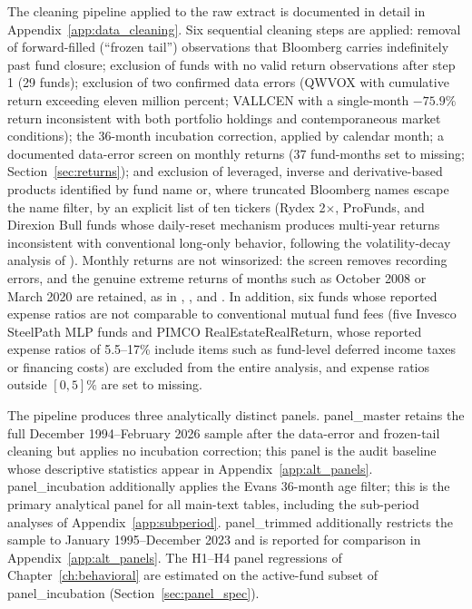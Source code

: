 \documentclass[12pt, oneside]{report}
\begin{document}
\noindent The cleaning pipeline applied to the raw extract is documented
in detail in Appendix~\ref{app:data_cleaning}. Six sequential cleaning
steps are applied: removal of forward-filled (``frozen tail'')
observations that Bloomberg carries indefinitely past fund closure; exclusion
of funds with no valid return observations after step 1 (29 funds);
exclusion of two confirmed data errors (QWVOX with cumulative return
exceeding eleven million percent; VALLCEN with a single-month
$-75.9\%$ return inconsistent with both portfolio holdings and
contemporaneous market conditions); the \textcite{Evans2010} 36-month
incubation correction, applied by calendar month; a documented data-error screen on monthly returns
(37 fund-months set to missing; Section~\ref{sec:returns}); and exclusion
of leveraged, inverse and derivative-based products identified by fund
name or, where truncated Bloomberg names escape the name filter, by an
explicit list of ten tickers (Rydex 2$\times$, ProFunds, and Direxion Bull funds whose daily-reset
mechanism produces multi-year returns inconsistent with conventional
long-only behavior, following the volatility-decay analysis of
\textcite{AvellanedaZhang2010}). Monthly returns are not winsorized:
the screen removes recording errors, and the genuine extreme returns of
months such as October 2008 or March 2020 are retained, as in
\textcite{Carhart1997}, \textcite{FamaFrench2010}, and
\textcite{BarrasScailletWermers2010}. In addition, six funds whose
reported expense ratios are not comparable to conventional mutual fund
fees (five Invesco SteelPath MLP funds and PIMCO RealEstateRealReturn,
whose reported expense ratios of 5.5--17\% include items such as
fund-level deferred income taxes or financing costs)
are excluded from the entire analysis, and expense ratios outside
$[0, 5]\%$ are set to missing.

The pipeline produces three analytically distinct panels.
panel\_master retains the full December 1994--February 2026
sample after the data-error and frozen-tail cleaning but applies no
incubation correction; this panel is the audit baseline whose
descriptive statistics appear in Appendix~\ref{app:alt_panels}.
panel\_incubation additionally applies the Evans 36-month age filter;
this is the primary analytical panel for all main-text tables, including
the sub-period analyses of Appendix~\ref{app:subperiod}.
panel\_trimmed additionally restricts the sample to January
1995--December 2023 and is reported for comparison in
Appendix~\ref{app:alt_panels}. The H1--H4 panel regressions of
Chapter~\ref{ch:behavioral} are estimated on the active-fund subset of
panel\_incubation (Section~\ref{sec:panel_spec}).
\end{document}
